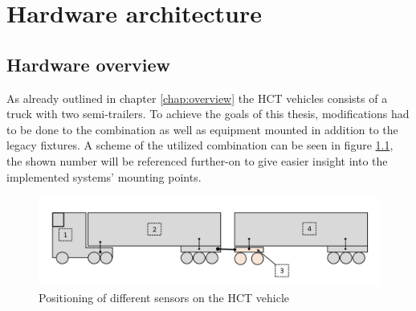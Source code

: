 \documentclass[ExampleMasters.tex]{subfiles}
\begin{document}
\clearpage
{\pagestyle{empty}\cleardoublepage}%


\chapter{Hardware architecture}
\label{chap:hardware_setup}

\section{Hardware overview}

As already outlined in chapter \ref{chap:overview} the \gls{HCT} vehicles consists of a truck with two semi-trailers. To achieve the goals of this thesis, modifications had to be done to the combination as well as equipment mounted in addition to the legacy fixtures. A scheme of the utilized combination can be seen in figure \ref{fig:combination_overview_with_positions}, the shown number will be referenced further-on to give easier insight into the implemented systems' mounting points.

\begin{figure}[!htb]
	\centering
	\includegraphics[width=1\linewidth]{figures/combination_overview_with_positions}
	\caption{Positioning of different sensors on the \acrlong{HCT} vehicle}
	\label{fig:combination_overview_with_positions}
\end{figure}
\end{document}
